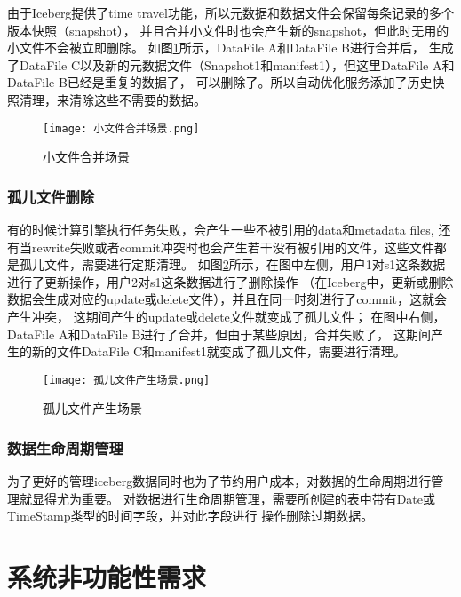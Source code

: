 由于Iceberg提供了time travel功能，所以元数据和数据文件会保留每条记录的多个版本快照（snapshot），
并且合并小文件时也会产生新的snapshot，但此时无用的小文件不会被立即删除。
如图\ref{fig:小文件合并场景}所示，DataFile A和DataFile B进行合并后，
生成了DataFile C以及新的元数据文件（Snapshot1和manifest1），但这里DataFile A和DataFile B已经是重复的数据了，
可以删除了。所以自动优化服务添加了历史快照清理，来清除这些不需要的数据。

\begin{figure}[H]
  \centering
  \texttt{[image: 小文件合并场景.png]}
  \caption{小文件合并场景}
  \label{fig:小文件合并场景}
\end{figure}

\subsubsection{孤儿文件删除}

有的时候计算引擎执行任务失败，会产生一些不被引用的data和metadata files,
还有当rewrite失败或者commit冲突时也会产生若干没有被引用的文件，这些文件都是孤儿文件，需要进行定期清理。
如图\ref{fig:孤儿文件产生场景}所示，在图中左侧，用户1对s1这条数据进行了更新操作，用户2对s1这条数据进行了删除操作
（在Iceberg中，更新或删除数据会生成对应的update或delete文件），并且在同一时刻进行了commit，这就会产生冲突，
这期间产生的update或delete文件就变成了孤儿文件；
在图中右侧，DataFile A和DataFile B进行了合并，但由于某些原因，合并失败了，
这期间产生的新的文件DataFile C和manifest1就变成了孤儿文件，需要进行清理。

\begin{figure}[H]
  \centering
  \texttt{[image: 孤儿文件产生场景.png]}
  \caption{孤儿文件产生场景}
  \label{fig:孤儿文件产生场景}
\end{figure}

\subsubsection{数据生命周期管理}

为了更好的管理iceberg数据同时也为了节约用户成本，对数据的生命周期进行管理就显得尤为重要\cite{36}。
对数据进行生命周期管理，需要所创建的表中带有Date或TimeStamp类型的时间字段，并对此字段进行
操作删除过期数据。

\section{系统非功能性需求}

